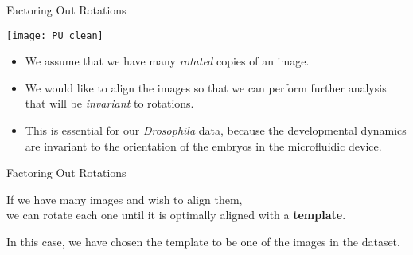 %

\begin{frame}{Factoring Out Rotations}
	
	\centering
	\texttt{[image: PU\_clean]}
	
	\begin{itemize}
	\item We assume that we have many {\em rotated} copies of an image.
	\item We would like to align the images so that we can perform further analysis that will be {\em invariant} to rotations. 
	\item This is essential for our {\em Drosophila} data, because the developmental dynamics are invariant to the orientation of the embryos in the microfluidic device.
	\end{itemize}

\end{frame}

\begin{frame}{Factoring Out Rotations}
	\centering	
	

	If we have many images and wish to align them, \\ we can rotate each one until it is optimally aligned with a {\bf template}.

	In this case, we have chosen the template to be one of the images in the dataset.
		
\end{frame}

